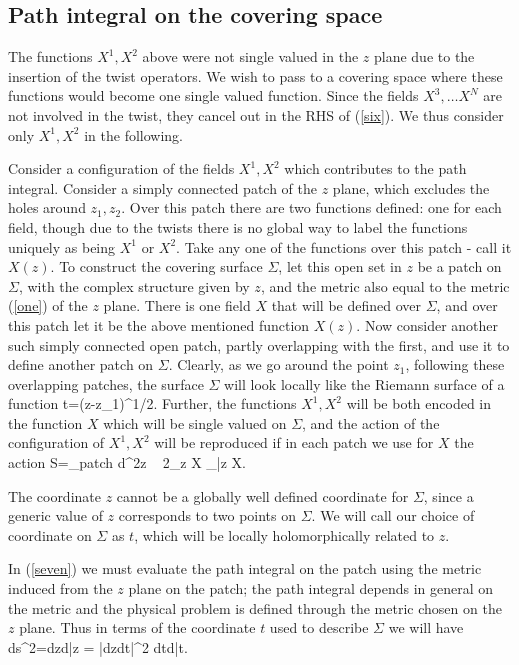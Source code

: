 \documentclass[12pt]{article}
\begin{document}
\subsection{Path integral on the covering space}

The functions $X^1, X^2$ above were not single valued in the $z$
plane due to the insertion of the twist operators. We wish
to pass to a covering space where these functions would become one
single valued function. Since the fields $X^3, \dots X^N$
are not involved in the twist, they cancel out in the RHS of
(\ref{six}).  We thus consider only  $X^1, X^2$ in the
following.

Consider a configuration of the fields $X^1, X^2$ which contributes
to the path integral. Consider a simply connected patch
of the
$z$ plane, which excludes the holes around
$z_1, z_2$. Over this patch there are two functions defined: one for
each field, though due to the twists there is no global
way to label the functions uniquely as being $X^1$ or $X^2$. Take any
one of the functions over this patch - call it $X(z)$.  To
construct the covering surface $\Sigma$, let this open set in $z$ be
a patch on $\Sigma$, with the complex structure given
by $z$, and the metric also equal to the metric (\ref{one}) of the
$z$ plane. There is one field $X$ that will be defined over
$\Sigma$, and over this patch let it be the above mentioned function
$X(z)$.  Now consider another such simply connected
open patch, partly overlapping with the first, and use it to define
another patch on $\Sigma$.  Clearly, as we go around the
point $z_1$, following these overlapping patches, the surface
$\Sigma$ will look locally like the Riemann surface of a
function
\be
t=(z-z_1)^{1/2}.
\label{sixp}
\ee
     Further, the functions $X^1, X^2$ will be
both encoded in the function $X$ which will be single
valued on $\Sigma$, and the action of the configuration of $X^1, X^2$
will be reproduced if in each patch we use for $X$ the
action
\be
S=\int_{\rm patch} d^2z ~ 2\partial_z X \partial_{\bar z} X.
\label{seven}
\ee

The coordinate $z$ cannot be a globally well defined coordinate for
$\Sigma$, since a generic value of $z$ corresponds to two
points on $\Sigma$. We will call our choice of coordinate on $\Sigma$
as $t$, which will be locally holomorphically related to
$z$.

     In (\ref{seven}) we must evaluate the path integral on the patch
using the metric induced from the $z$ plane on
the patch;
the path integral depends in general on the metric and the physical
problem is defined through the metric
chosen on the $z$  plane. Thus in terms
of the coordinate $t$ used to describe $\Sigma$ we
will have
\be
ds^2=dzd\bar z = |{dz\over dt}|^2 dtd\bar t.
\label{el}
\ee
\end{document}
